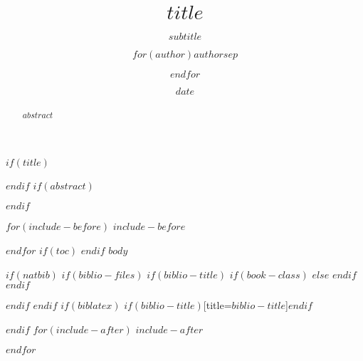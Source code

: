 \documentclass[$if(fontsize)$$fontsize$,$endif$$if(lang)$$lang$,$endif$$if(papersize)$$papersize$,$endif$$for(classoption)$$classoption$$sep$,$endfor$]{$documentclass$}
\title{$title$}
\subtitle{$subtitle$}
\author{$for(author)$$author$$sep$ \and $endfor$}
\date{$date$}
\begin{document}
$if(title)$
\maketitle
$endif$
$if(abstract)$
\begin{abstract}
$abstract$
\end{abstract}
$endif$

$for(include-before)$
$include-before$

$endfor$
$if(toc)$
{
\hypersetup{linkcolor=black}
\setcounter{tocdepth}{$toc-depth$}
\tableofcontents
}
$endif$
$body$

$if(natbib)$
$if(biblio-files)$
$if(biblio-title)$
$if(book-class)$
\renewcommand\bibname{$biblio-title$}
$else$
\renewcommand\refname{$biblio-title$}
$endif$
$endif$


$endif$
$endif$
$if(biblatex)$
\printbibliography$if(biblio-title)$[title=$biblio-title$]$endif$

$endif$
$for(include-after)$
$include-after$

$endfor$
\end{document}
